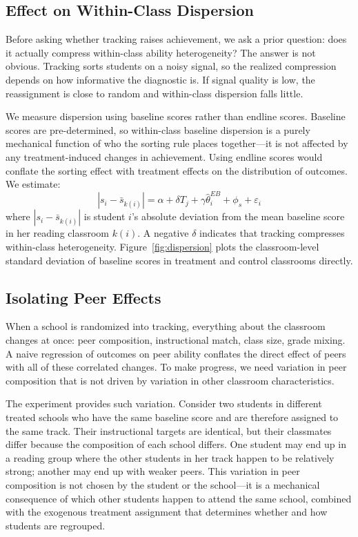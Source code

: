 \documentclass[11pt]{article}
\begin{document}
\subsection{Effect on Within-Class Dispersion}
\label{sec:dispersion}

Before asking whether tracking raises achievement, we ask a prior question: does it actually compress within-class ability heterogeneity? The answer is not obvious. Tracking sorts students on a noisy signal, so the realized compression depends on how informative the diagnostic is. If signal quality is low, the reassignment is close to random and within-class dispersion falls little.

We measure dispersion using baseline scores rather than endline scores. Baseline scores are pre-determined, so within-class baseline dispersion is a purely mechanical function of who the sorting rule places together---it is not affected by any treatment-induced changes in achievement. Using endline scores would conflate the sorting effect with treatment effects on the distribution of outcomes. We estimate:
\begin{equation}
|s_i - \bar{s}_{k(i)}| = \alpha + \delta T_j + \gamma \hat{\theta}^{EB}_i + \phi_s + \varepsilon_i
\end{equation}
where $|s_i - \bar{s}_{k(i)}|$ is student $i$'s absolute deviation from the mean baseline score in her reading classroom $k(i)$. A negative $\delta$ indicates that tracking compresses within-class heterogeneity. Figure~\ref{fig:dispersion} plots the classroom-level standard deviation of baseline scores in treatment and control classrooms directly.

\subsection{Isolating Peer Effects}
\label{sec:bh}

When a school is randomized into tracking, everything about the classroom changes at once: peer composition, instructional match, class size, grade mixing. A naive regression of outcomes on peer ability conflates the direct effect of peers with all of these correlated changes. To make progress, we need variation in peer composition that is not driven by variation in other classroom characteristics.

The experiment provides such variation. Consider two students in different treated schools who have the same baseline score and are therefore assigned to the same track. Their instructional targets are identical, but their classmates differ because the composition of each school differs. One student may end up in a reading group where the other students in her track happen to be relatively strong; another may end up with weaker peers. This variation in peer composition is not chosen by the student or the school---it is a mechanical consequence of which other students happen to attend the same school, combined with the exogenous treatment assignment that determines whether and how students are regrouped.
\end{document}

